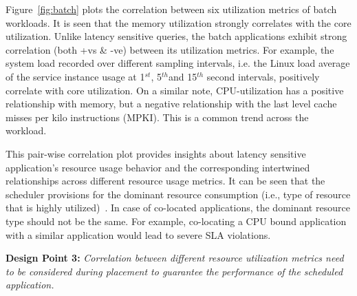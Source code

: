 Figure~\ref{fig:batch} plots the correlation between six utilization metrics of batch workloads. It is seen that the memory utilization strongly correlates with the core utilization. Unlike latency sensitive queries, the batch applications exhibit strong correlation (both +vs \& -ve) between its utilization metrics. For example, the system load recorded over different sampling intervals, i.e. the Linux load average of the service instance usage at 1$^{st}$, 5$^{th}$and 15$^{th}$ second intervals, positively correlate with core utilization. On a similar note, CPU-utilization has a positive relationship with memory, but a negative relationship with the last level cache misses per kilo instructions (MPKI). This is a common trend across the workload.

This pair-wise correlation plot provides insights about latency sensitive application's resource usage behavior and the corresponding intertwined relationships across different resource usage metrics. It can be seen that the scheduler provisions for the dominant resource consumption (i.e., type of resource that is highly utilized)~\cite{Ghodsi:2011:DRF:1972457.1972490}. In case of co-located applications, the dominant resource type should not be the same. For example, co-locating a CPU bound application with a similar application would lead to severe SLA violations. 

\textbf{Design Point 3:}\textit{ Correlation between different resource utilization metrics need to be considered during placement to guarantee the performance of the scheduled application.}



 

